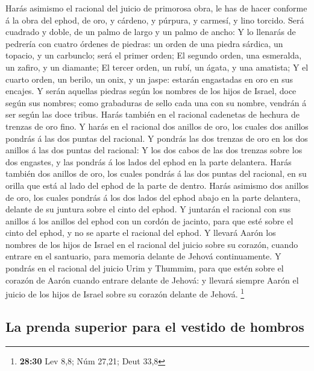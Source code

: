  Harás asimismo el racional del juicio de primorosa obra,
le has de hacer conforme á la obra del ephod, de oro, y cárdeno, y
púrpura, y carmesí, y lino torcido.  Será cuadrado y doble,
de un palmo de largo y un palmo de ancho:  Y lo llenarás de
pedrería con cuatro órdenes de piedras: un orden de una piedra sárdica,
un topacio, y un carbunclo; será el primer orden;  El
segundo orden, una esmeralda, un zafiro, y un diamante;  El
tercer orden, un rubí, un ágata, y una amatista;  Y el
cuarto orden, un berilo, un onix, y un jaspe: estarán engastadas en oro
en sus encajes.  Y serán aquellas piedras según los nombres
de los hijos de Israel, doce según sus nombres; como grabaduras de sello
cada una con su nombre, vendrán á ser según las doce tribus.
 Harás también en el racional cadenetas de hechura de
trenzas de oro fino.  Y harás en el racional dos anillos de
oro, los cuales dos anillos pondrás á las dos puntas del racional.
 Y pondrás las dos trenzas de oro en los dos anillos á las
dos puntas del racional:  Y los dos cabos de las dos
trenzas sobre los dos engastes, y las pondrás á los lados del ephod en
la parte delantera.  Harás también dos anillos de oro, los
cuales pondrás á las dos puntas del racional, en su orilla que está al
lado del ephod de la parte de dentro.  Harás asimismo dos
anillos de oro, los cuales pondrás á los dos lados del ephod abajo en la
parte delantera, delante de su juntura sobre el cinto del ephod.
 Y juntarán el racional con sus anillos á los anillos del
ephod con un cordón de jacinto, para que esté sobre el cinto del ephod,
y no se aparte el racional del ephod.  Y llevará Aarón los
nombres de los hijos de Israel en el racional del juicio sobre su
corazón, cuando entrare en el santuario, para memoria delante de Jehová
continuamente.  Y pondrás en el racional del juicio Urim y
Thummim, para que estén sobre el corazón de Aarón cuando entrare delante
de Jehová: y llevará siempre Aarón el juicio de los hijos de Israel
sobre su corazón delante de Jehová. \footnote{\textbf{28:30} Lev 8,8;
  Núm 27,21; Deut 33,8}

\hypertarget{la-prenda-superior-para-el-vestido-de-hombros}{%
\subsection{La prenda superior para el vestido de
hombros}\label{la-prenda-superior-para-el-vestido-de-hombros}}

